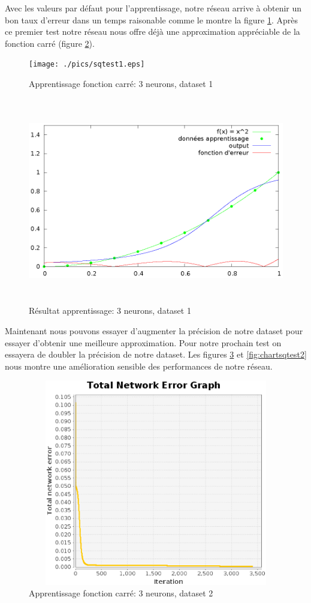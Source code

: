 \documentclass[twoside,openright,a4paper,11pt,french]{article}
\begin{document}
Avec les valeurs par défaut pour l'apprentissage, notre réseau arrive à obtenir
un bon taux d'erreur dans un temps raisonable comme le montre la figure
\ref{fig:sqtest1}. Après ce premier test notre réseau nous offre déjà une
approximation appréciable de la fonction carré (figure \ref{fig:chartsqtest1}).

\begin{figure}[ht]
\centering
\texttt{[image: ./pics/sqtest1.eps]}
\caption{Apprentissage fonction carré: 3 neurons, dataset 1}
\label{fig:sqtest1}
\end{figure}

\begin{figure}[ht]
\centering
\includegraphics[width=12cm,height=9cm]{./pics/chartsqtest1.eps}
\caption{Résultat apprentissage: 3 neurons, dataset 1}
\label{fig:chartsqtest1}
\end{figure}

Maintenant nous pouvons essayer d'augmenter la précision de notre dataset
pour essayer d'obtenir une meilleure approximation. Pour notre 
prochain test on essayera de doubler la précision de notre dataset.
Les figures \ref{fig:sqtest2} et \ref{fig:chartsqtest2} nous montre 
une amélioration sensible des performances de notre réseau. 



\begin{figure}[ht]
\centering
\includegraphics[width=12cm,height=9cm]{./pics/sqtest2.eps}
\caption{Apprentissage fonction carré: 3 neurons, dataset 2}
\label{fig:sqtest2}
\end{figure}
\end{document}
